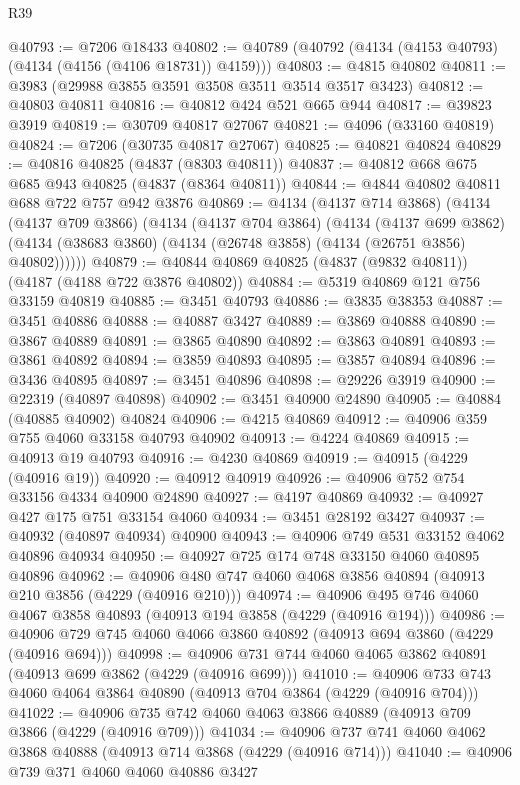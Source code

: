 \begin{lexlean}{R39}
\begin{coremodule}
@40793 := @7206 @18433
@40802 := @40789 (@40792 (@4134 (@4153 @40793) (@4134 (@4156 (@4106 @18731)) @4159)))
@40803 := @4815 @40802
@40811 := @3983 (@29988 @3855 @3591 @3508 @3511 @3514 @3517 @3423)
@40812 := @40803 @40811
@40816 := @40812 @424 @521 @665 @944
@40817 := @39823 @3919
@40819 := @30709 @40817 @27067
@40821 := @4096 (@33160 @40819)
@40824 := @7206 (@30735 @40817 @27067)
@40825 := @40821 @40824
@40829 := @40816 @40825 (@4837 (@8303 @40811))
@40837 := @40812 @668 @675 @685 @943 @40825 (@4837 (@8364 @40811))
@40844 := @4844 @40802 @40811 @688 @722 @757 @942 @3876
@40869 := @4134
    (@4137 @714 @3868)
    (@4134
      (@4137 @709 @3866)
      (@4134
        (@4137 @704 @3864)
        (@4134
          (@4137 @699 @3862)
          (@4134 (@38683 @3860) (@4134 (@26748 @3858) (@4134 (@26751 @3856) @40802))))))
@40879 := @40844 @40869 @40825 (@4837 (@9832 @40811)) (@4187 (@4188 @722 @3876 @40802))
@40884 := @5319 @40869 @121 @756 @33159 @40819
@40885 := @3451 @40793
@40886 := @3835 @38353
@40887 := @3451 @40886
@40888 := @40887 @3427
@40889 := @3869 @40888
@40890 := @3867 @40889
@40891 := @3865 @40890
@40892 := @3863 @40891
@40893 := @3861 @40892
@40894 := @3859 @40893
@40895 := @3857 @40894
@40896 := @3436 @40895
@40897 := @3451 @40896
@40898 := @29226 @3919
@40900 := @22319 (@40897 @40898)
@40902 := @3451 @40900 @24890
@40905 := @40884 (@40885 @40902) @40824
@40906 := @4215 @40869
@40912 := @40906 @359 @755 @4060 @33158 @40793 @40902
@40913 := @4224 @40869
@40915 := @40913 @19 @40793
@40916 := @4230 @40869
@40919 := @40915 (@4229 (@40916 @19))
@40920 := @40912 @40919
@40926 := @40906 @752 @754 @33156 @4334 @40900 @24890
@40927 := @4197 @40869
@40932 := @40927 @427 @175 @751 @33154 @4060
@40934 := @3451 @28192 @3427
@40937 := @40932 (@40897 @40934) @40900
@40943 := @40906 @749 @531 @33152 @4062 @40896 @40934
@40950 := @40927 @725 @174 @748 @33150 @4060 @40895 @40896
@40962 := @40906 @480 @747 @4060 @4068 @3856 @40894 (@40913 @210 @3856 (@4229 (@40916 @210)))
@40974 := @40906 @495 @746 @4060 @4067 @3858 @40893 (@40913 @194 @3858 (@4229 (@40916 @194)))
@40986 := @40906 @729 @745 @4060 @4066 @3860 @40892 (@40913 @694 @3860 (@4229 (@40916 @694)))
@40998 := @40906 @731 @744 @4060 @4065 @3862 @40891 (@40913 @699 @3862 (@4229 (@40916 @699)))
@41010 := @40906 @733 @743 @4060 @4064 @3864 @40890 (@40913 @704 @3864 (@4229 (@40916 @704)))
@41022 := @40906 @735 @742 @4060 @4063 @3866 @40889 (@40913 @709 @3866 (@4229 (@40916 @709)))
@41034 := @40906 @737 @741 @4060 @4062 @3868 @40888 (@40913 @714 @3868 (@4229 (@40916 @714)))
@41040 := @40906 @739 @371 @4060 @4060 @40886 @3427

\end{coremodule}
\end{lexlean}
